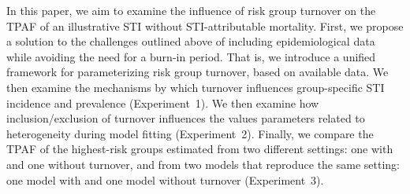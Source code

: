 \par
In this paper, we aim to examine the influence of risk group turnover
on the TPAF of an illustrative STI without STI-attributable mortality.
First, we propose a solution to the challenges outlined above
of including epidemiological data while avoiding the need for a burn-in period.
That is, we introduce a unified framework for
parameterizing risk group turnover, based on available data.
We then examine the mechanisms by which turnover
influences group-specific STI incidence and prevalence
(Experiment~1).
We then examine how inclusion/exclusion of turnover influences
the values parameters related to heterogeneity during model fitting
(Experiment~2).
Finally, we compare the TPAF of the highest-risk groups estimated
from two different settings: one with and one without turnover,
and from two models that reproduce the same setting:
one model with and one model without turnover
(Experiment~3).